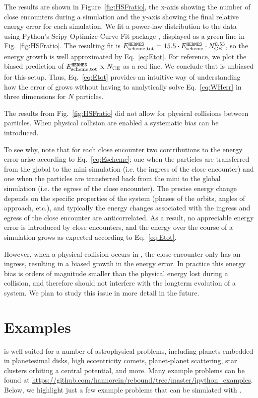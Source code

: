 The results are shown in Figure~\ref{fig:HSFratio}, the x-axis showing the number of close encounters during a simulation and the y-axis showing the final relative energy error for each simulation.
We fit a power-law distribution to the data using Python's Scipy Optimize Curve Fit package \citep{Scipy2016}, displayed as a green line in Fig.~\ref{fig:HSFratio}. 
The resulting fit is $E_{\rm scheme,tot}^{{\sc \tt HERMES}}= 15.5 \cdot E_{\rm scheme}^{{\sc \tt HERMES}} \cdot N_{\rm CE}^{0.53}$, so the energy growth is well approximated by Eq.~\ref{eq:Etot}. 
For reference, we plot the biased prediction of $E_{\rm scheme,tot}^{{\sc \tt HERMES}} \propto N_{\rm CE}$ as a red line.
We conclude that \hermes is unbiased for this setup.
Thus, Eq.~\ref{eq:Etot} provides an intuitive way of understanding how the error of \hermes grows without having to analytically solve Eq.~\ref{eq:WHerr} in three dimensions for $N$ particles. 

The results from Fig.~\ref{fig:HSFratio} did not allow for physical collisions between particles. When physical collision are enabled a systematic bias can be introduced. 

To see why, note that for each close encounter two contributions to the energy error arise according to Eq.~\ref{eq:Escheme}; one when the particles are transferred from the global to the mini simulation (i.e. the ingress of the close encounter) and one when the particles are transferred back from the mini to the global simulation (i.e. the egress of the close encounter).
The precise energy change depends on the specific properties of the system (phases of the orbits, angles of approach, etc.), and typically the energy changes associated with the ingress and egress of the close encounter are anticorrelated. 
As a result, no appreciable energy error is introduced by close encounters, and the energy over the course of a simulation grows as expected according to Eq.~\ref{eq:Etot}.

However, when a physical collision occurs in \hermes,  the close encounter only has an ingress, resulting in a biased growth in the energy error. 
In practice this energy bias is orders of magnitude smaller than the physical energy lost during a collision, and therefore should not interfere with the longterm evolution of a system. 
We plan to study this issue in more detail in the future. 

\section{Examples}
\label{sec:Examples}
\hermes is well suited for a number of astrophysical problems, including planets embedded in planetesimal disks, high eccentricity comets, planet-planet scattering, star clusters orbiting a central potential, and more. 
Many example problems can be found at \url{https://github.com/hannorein/rebound/tree/master/ipython_examples}.
Below, we highlight just a few example problems that can be simulated with \hermes.

